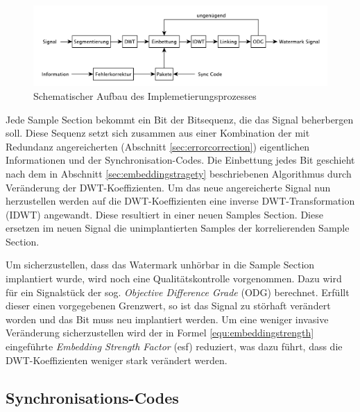 \begin{figure}[h]
	\centering
	\includegraphics[width=\textwidth]{figures/diagram-encoder-v2.pdf}
	\caption{Schematischer Aufbau des Implemetierungsprozesses}
	\label{fig:diagram-encoder}
\end{figure}

Jede Sample Section bekommt ein Bit der Bitsequenz, die das Signal beherbergen soll. Diese Sequenz setzt sich zusammen aus einer Kombination der mit Redundanz angereicherten (Abschnitt \ref{sec:errorcorrection}) eigentlichen Informationen und der Synchronisation-Codes. Die Einbettung jedes Bit geschieht nach dem in Abschnitt \ref{sec:embeddingstragety} beschriebenen Algorithmus durch Veränderung der DWT-Koeffizienten. Um das neue angereicherte Signal nun herzustellen werden auf die DWT-Koeffizienten eine inverse DWT-Transformation (IDWT) angewandt. Diese resultiert in einer neuen Samples Section. Diese ersetzen im neuen Signal die unimplantierten Samples der korrelierenden Sample Section. 

Um sicherzustellen, dass das Watermark unhörbar in die Sample Section implantiert wurde, wird noch eine Qualitätskontrolle vorgenommen. Dazu wird für ein Signalstück der sog. \textit{Objective Difference Grade} (ODG) berechnet. Erfüllt dieser einen vorgegebenen Grenzwert, so ist das Signal zu störhaft verändert worden und das Bit muss neu implantiert werden. Um eine weniger invasive Veränderung sicherzustellen wird der in Formel \ref{equ:embeddingstrength} eingeführte \textit{Embedding Strength Factor} (esf) reduziert, was dazu führt, dass die DWT-Koeffizienten weniger stark verändert werden.

\subsection{Synchronisations-Codes}

